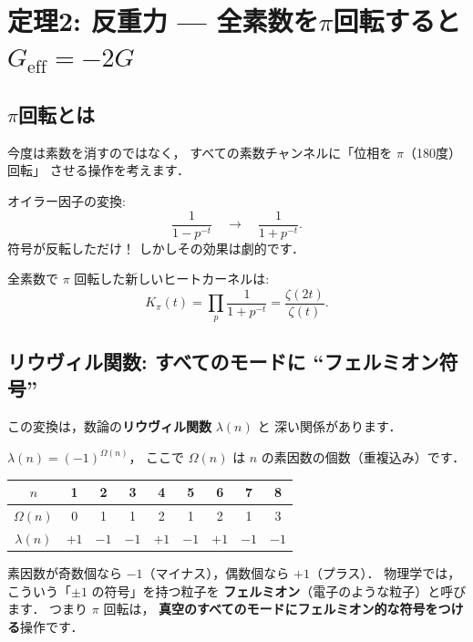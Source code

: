 \documentclass[11pt,a4paper]{article}
\begin{document}
\section{定理2: 反重力 --- 全素数を$\pi$回転すると$G_{\text{eff}} = -2G$}

\subsection{$\pi$回転とは}

今度は素数を消すのではなく，
すべての素数チャンネルに「位相を $\pi$（180度）回転」
させる操作を考えます．

オイラー因子の変換:
\[
  \frac{1}{1 - p^{-t}} \quad\longrightarrow\quad \frac{1}{1 + p^{-t}}.
\]
符号が反転しただけ！ しかしその効果は劇的です．

全素数で $\pi$ 回転した新しいヒートカーネルは:
\begin{equation}
  K_\pi(t) = \prod_{p} \frac{1}{1 + p^{-t}} = \frac{\zeta(2t)}{\zeta(t)}.
\end{equation}

\subsection{リウヴィル関数: すべてのモードに ``フェルミオン符号''}

この変換は，数論の\textbf{リウヴィル関数} $\lambda(n)$ と
深い関係があります．

$\lambda(n) = (-1)^{\Omega(n)}$，
ここで $\Omega(n)$ は $n$ の素因数の個数（重複込み）です．

\begin{center}
\begin{tabular}{c|cccccccc}
$n$ & 1 & 2 & 3 & 4 & 5 & 6 & 7 & 8 \\
\hline
$\Omega(n)$ & 0 & 1 & 1 & 2 & 1 & 2 & 1 & 3 \\
$\lambda(n)$ & $+1$ & $-1$ & $-1$ & $+1$ & $-1$ & $+1$ & $-1$ & $-1$ \\
\end{tabular}
\end{center}

素因数が奇数個なら $-1$（マイナス），偶数個なら $+1$（プラス）．
物理学では，こういう「$\pm 1$ の符号」を持つ粒子を
\textbf{フェルミオン}（電子のような粒子）と呼びます．
つまり $\pi$ 回転は，
\textbf{真空のすべてのモードにフェルミオン的な符号をつける}操作です．
\end{document}
